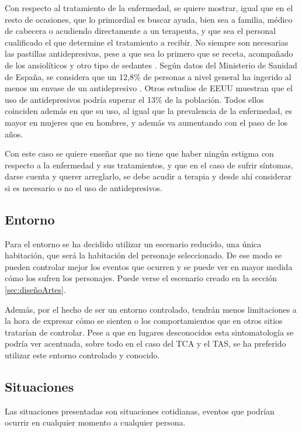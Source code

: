 \documentclass[12pt, a4paper,twoside,titlepage]{book}
\begin{document}
\begin{itemize}
{Con respecto al tratamiento de la enfermedad, se quiere mostrar, igual que en el resto de ocasiones, que lo primordial es buscar ayuda, bien sea a familia, médico de cabecera o acudiendo directamente a un terapeuta, y que sea el personal cualificado el que determine el tratamiento a recibir. No siempre son necesarias las pastillas antidepresivas, pese a que sea lo primero que se receta, acompañado de los ansiolíticos y otro tipo de sedantes \cite{articuloDEP7}. Según datos del Ministerio de Sanidad de España, se considera que un 12,8\% de personas a nivel general ha ingerido al menos un envase de un antidepresivo \cite{articuloDEP8}.  Otros estudios de EEUU muestran que el uso de antidepresivos podría superar el 13\% de la población. Todos ellos coinciden además en que su uso, al igual que la prevalencia de la enfermedad, es mayor en mujeres que en hombres, y además va aumentando con el paso de los años. 

Con este caso se quiere enseñar que no tiene que haber ningún estigma con respecto a la enfermedad y sus tratamientos, y que en el caso de sufrir síntomas, darse cuenta y querer arreglarlo, se debe acudir a terapia y desde ahí considerar si es necesario o no el uso de antidepresivos. 
}
     
\end{itemize}




\subsection{Entorno}
Para el entorno se ha decidido utilizar un escenario reducido, una única habitación, que será la habitación del personaje seleccionado. De ese modo se pueden controlar mejor los eventos que ocurren y se puede ver en mayor medida cómo los sufren los personajes. Puede verse el escenario creado en la sección \ref{sec:diseñoArtes}. 

Además, por el hecho de ser un entorno controlado, tendrán menos limitaciones a la hora de expresar cómo se sienten o los comportamientos que en otros sitios tratarían de controlar. Pese a que en lugares desconocidos esta sintomatología se podría ver acentuada, sobre todo en el caso del TCA y el TAS, se ha preferido utilizar este entorno controlado y conocido.  

\subsection{Situaciones}
Las situaciones presentadas son situaciones cotidianas, eventos que podrían ocurrir en cualquier momento a cualquier persona. 
\end{document}
